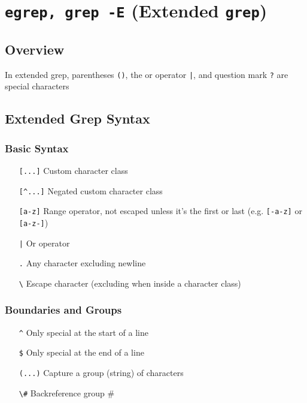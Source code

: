 \documentclass[13pt]{article}
\begin{document}
\section{\texttt{egrep, grep -E} (Extended \texttt{grep})}
\subsection{Overview}
In extended grep, parentheses \texttt{()}, the or operator \texttt{|}, and question mark \texttt{?} are special characters

\subsection{Extended Grep Syntax}
\subsubsection{Basic Syntax}
\begin{itemize}[label=]
\item [\texttt{[...]}] Custom character class
\item [\texttt{[\^}\texttt{...]}] Negated custom character class
\item [\texttt{[a-z]}] Range operator, not escaped unless it's the first or last (e.g. \texttt{[-a-z]} or \texttt{[a-z-]})
\item [\texttt{|}] Or operator
\item [\texttt{.}] Any character excluding newline
\item [\texttt{\textbackslash}] Escape character (excluding when inside a character class)
\end{itemize}

\subsubsection{Boundaries and Groups}
\begin{itemize}[label=]
\item [\texttt{\^}] Only special at the start of a line
\item [\texttt{\$}] Only special at the end of a line
\item [\texttt{(...)}] Capture a group (string) of characters
\item [\texttt{\textbackslash\#}] Backreference group \#
\end{itemize}
\end{document}
